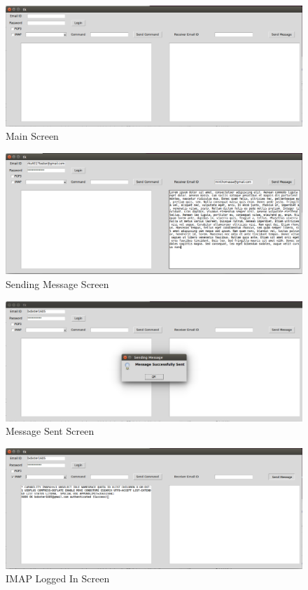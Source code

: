 \documentclass[11pt]{article}
\begin{document}
\newpage
\begin{thebibliography}{9}

\end{thebibliography}
\newpage
\appendix
\begin{figure}[h]
\centering
\caption{Main Screen}
\includegraphics[scale=0.7]{MainSCreen.png}
\end{figure}

\begin{figure}[h]
\centering
\caption{Sending Message Screen}
\includegraphics[scale=0.7]{sendingMessage.png}
\end{figure}

\begin{figure}[h]
\centering
\caption{Message Sent Screen}
\includegraphics[scale=0.7]{messageSent.png}
\end{figure}

\begin{figure}[h]
\centering
\caption{IMAP Logged In Screen}
\includegraphics[scale=0.7]{IMAPloggedIn.png}
\end{figure}
\end{document}

